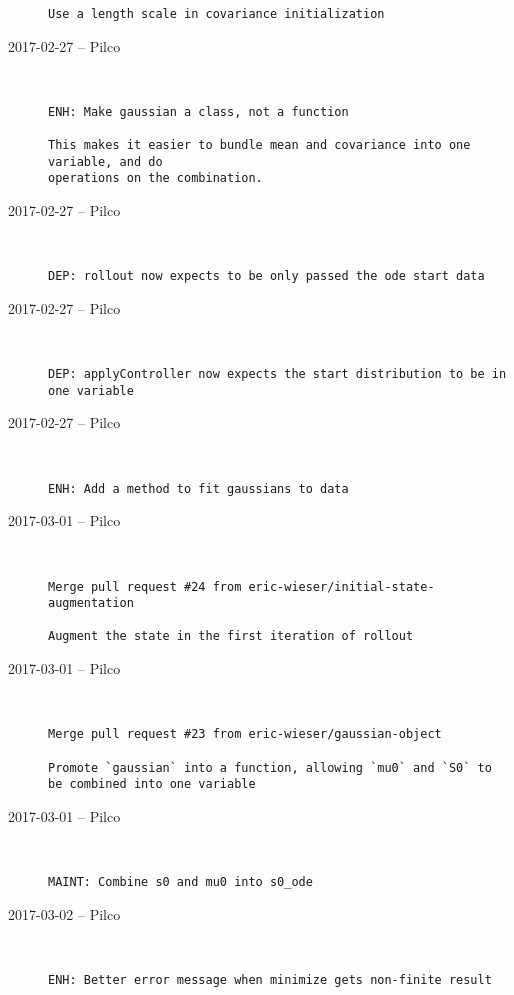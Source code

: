 \begin{description}
\begin{lstlisting}
Use a length scale in covariance initialization\end{lstlisting}


  \item[2017-02-27 -- Pilco] \hfill \
\begin{lstlisting}
ENH: Make gaussian a class, not a function

This makes it easier to bundle mean and covariance into one variable, and do
operations on the combination.
\end{lstlisting}


  \item[2017-02-27 -- Pilco] \hfill \
\begin{lstlisting}
DEP: rollout now expects to be only passed the ode start data
\end{lstlisting}


  \item[2017-02-27 -- Pilco] \hfill \
\begin{lstlisting}
DEP: applyController now expects the start distribution to be in one variable
\end{lstlisting}


  \item[2017-02-27 -- Pilco] \hfill \
\begin{lstlisting}
ENH: Add a method to fit gaussians to data
\end{lstlisting}


  \item[2017-03-01 -- Pilco] \hfill \
\begin{lstlisting}
Merge pull request #24 from eric-wieser/initial-state-augmentation

Augment the state in the first iteration of rollout\end{lstlisting}


  \item[2017-03-01 -- Pilco] \hfill \
\begin{lstlisting}
Merge pull request #23 from eric-wieser/gaussian-object

Promote `gaussian` into a function, allowing `mu0` and `S0` to be combined into one variable\end{lstlisting}


  \item[2017-03-01 -- Pilco] \hfill \
\begin{lstlisting}
MAINT: Combine s0 and mu0 into s0_ode
\end{lstlisting}


  \item[2017-03-02 -- Pilco] \hfill \
\begin{lstlisting}
ENH: Better error message when minimize gets non-finite result
\end{lstlisting}



\end{description}
